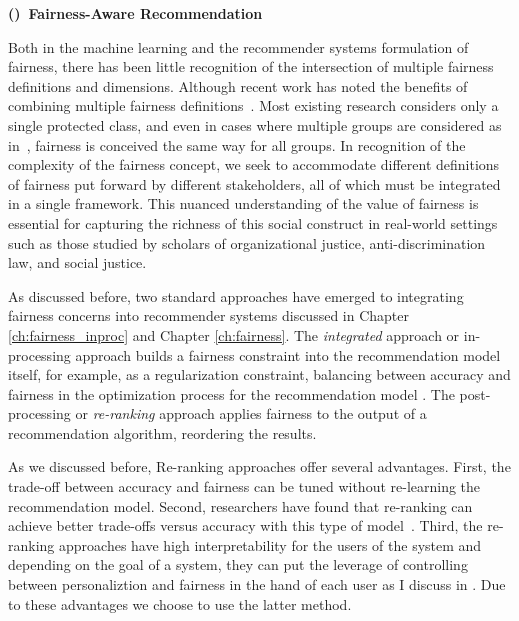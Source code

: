 \vspace{0.25cm}
\noindent \textbf{()~Fairness-Aware Recommendation}
\vspace{0.25cm}

Both in the machine learning and the recommender systems formulation of fairness, there has been little recognition of the intersection of multiple fairness definitions and dimensions. Although recent work has noted the benefits of combining multiple fairness definitions~\cite{beutel2019fairness}. Most existing research considers only a single protected class, and even in cases where multiple groups are considered as in~\cite{buolamwini2018gender,hebert2018multicalibration,kearns2017preventing,zhu2018fairness}, fairness is conceived the same way for all groups. In recognition of the complexity of the fairness concept, we seek to accommodate different definitions of fairness put forward by different stakeholders, all of which must be integrated in a single framework. This nuanced understanding of the value of fairness is essential for capturing the richness of this social construct in real-world settings such as those studied by scholars of organizational justice, anti-discrimination law, and social justice.

As discussed before, two standard approaches have emerged to integrating fairness concerns into recommender systems discussed in Chapter \ref{ch:fairness_inproc} and Chapter \ref{ch:fairness}. The \textit{integrated} approach or in-processing approach builds a fairness constraint into the recommendation model itself, for example, as a regularization constraint, balancing between accuracy and fairness in the optimization process for the recommendation model \cite{kamishima2012fairness,yao2017beyond}. The post-processing or \textit{re-ranking} approach applies fairness to the output of a recommendation algorithm, reordering the results. 

As we discussed before, Re-ranking approaches offer several advantages. First, the trade-off between accuracy and fairness can be tuned without re-learning the recommendation model. Second, researchers have found that re-ranking can achieve better trade-offs versus accuracy with this type of model~\cite{pmlr-v81-ekstrand18b,abdollahpouri2019managing,liu2019personalized}. Third, the re-ranking approaches have high interpretability for the users of the system and depending on the goal of a system, they can put the leverage of controlling between personaliztion and fairness in the hand of each user as I discuss in \cite{Sonboli2021transparency}. Due to these advantages we choose to use the latter method.

